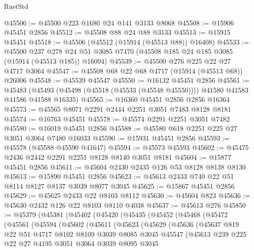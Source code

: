 \begin{lexlean}{RustStd}
\begin{coremodule}
@45506 := @45500 @223 @1680 @24 @141 @3133 @8068
@45508 := @15906 @45451 @2856
@45512 := @45508 @88 @24 @88 @3133
@45513 := @15915 @45451
@45518 := @45506 (@45512 (@15914 (@45513 @88)) @16408)
@45533 := @45500
    @237
    @278
    @24
    @51
    @3085
    @7470
    (@45508 @185 @24 @185 @3085 (@15914 (@45513 @185)) @16094)
@45539 := @45500 @276 @225 @22 @27 @4717 @3064
@45547 := @45508 @68 @22 @68 @4717 (@15914 (@45513 @68)) @26006
@45548 := @45539 @45547
@45550 := @16132 @45451 @2856
@45561 := @45483
    (@45493 (@45498 (@45518 (@45533 (@45548 @45550)))) @41580 @41583 @41586 @41588 @16335)
@45565 := @16360 @45451 @2856 @2856 @16364
@45573 := @45565 @8071 @2291 @2444 @2251 @3051 @7483 @8128 @8181
@45574 := @16763 @45451
@45578 := @45574 @2291 @2251 @3051 @7482
@45580 := @16019 @45451 @2856
@45588 := @45580 @618 @2251 @225 @27 @3051 @3064 @7480 @16033
@45590 := @15931 @45451 @2856
@45593 := @45578 (@45588 @45590 @41647)
@45594 := @45573 @45593
@45602 := @45475 @2436 @2442 @2291 @2251 @8128 @8140 @3051 @8181
@45604 := @15877 @45451 @2856
@45611 := @45604 @2430 @2435 @126 @53 @8128 @8138 @8130
@45613 := @15890 @45451 @2856
@45623 := @45613 @2433 @740 @22 @51 @8114 @8127 @8137 @3039 @8077 @3045
@45625 := @15867 @45451 @2856
@45629 := @45625 @2433 @22 @8103 @8112
@45630 := @45604 @823
@45636 := @45630 @2432 @126 @22 @8103 @8110 @4038
@45637 := @45613 @276
@45850 := @45379
    (@45381
      (@45402
        (@45420
          (@45435
            (@45452
              (@45468
                (@45472
                  (@45561
                    (@45594
                      (@45602
                        (@45611
                          (@45623
                            (@45629
                              (@45636
                                (@45637
                                  @819
                                  @22
                                  @51
                                  @4717
                                  @8102
                                  @8109
                                  @3039
                                  @8085
                                  @3045
                                  @45547
                                  (@45613
                                    @239
                                    @225
                                    @22
                                    @27
                                    @4195
                                    @3051
                                    @3064
                                    @3039
                                    @8095
                                    @3045

\end{coremodule}
\end{lexlean}
